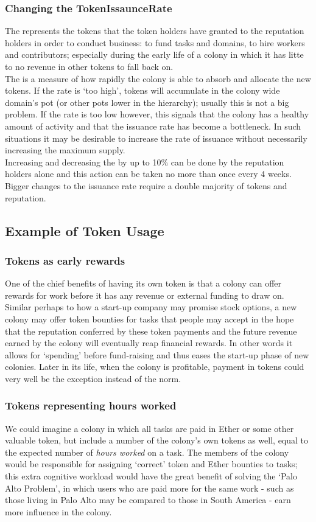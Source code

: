 \subsubsection{Changing the TokenIssaunceRate}
The  represents the tokens that the token holders have granted to the reputation holders in order to conduct business: to fund tasks and domains, to hire workers and contributors; especially during the early life of a colony in which it has litte to no revenue in other tokens to fall back on.\\
The  is a measure of how rapidly the colony is able to absorb and allocate the new tokens. If the rate is `too high', tokens will accumulate in the colony wide domain's pot (or other pots lower in the hierarchy); usually this is not a big problem. If the rate is too low however, this signals that the colony has a healthy amount of activity and that the issuance rate has become a bottleneck. In such situations it may be desirable to increase the rate of issuance without necessarily increasing the maximum supply. \\
Increasing and decreasing the  by up to 10\% can be done by the reputation holders alone and this action can be taken no more than once every 4 weeks. Bigger changes to the issuance rate require a double majority of tokens and reputation.


\subsection{Example of Token Usage}\label{sec:colony-token-examples}
\subsubsection*{Tokens as early rewards}
One of the chief benefits of having its own token is that a colony can offer rewards for work before it has any revenue or external funding to draw on. Similar perhaps to how a start-up company may promise stock options, a new colony may offer token bounties for tasks that people may accept in the hope that the reputation conferred by these token payments and the future revenue earned by the colony will eventually reap financial rewards. In other words it allows for `spending' before fund-raising and thus eases the start-up phase of new colonies. Later in its life, when the colony is profitable, payment in tokens could very well be the exception instead of the norm.
\subsubsection*{Tokens representing hours worked}
We could imagine a colony in which all tasks are paid in Ether or some other valuable token, but include a number of the colony's own tokens as well, equal to the expected number of \emph{hours worked} on a task. The members of the colony would be responsible for assigning `correct' token and Ether bounties to tasks; this extra cognitive workload would have the great benefit of solving the `Palo Alto Problem', in which users who are paid more for the same work - such as those living in Palo Alto may be compared to those in South America - earn more influence in the colony. 
